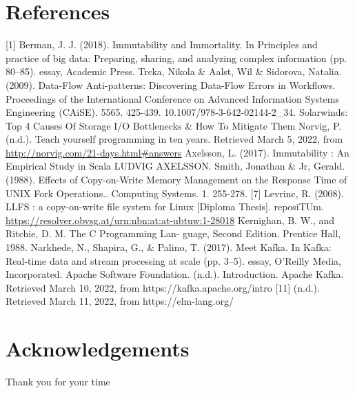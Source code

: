 \documentclass[12pt,twoside]{article}
\begin{document}
\section{References}
[1] Berman, J. J. (2018). Immutability and Immortality. In Principles and practice of big data: Preparing, sharing, and analyzing complex information (pp. 80–85). essay, Academic Press. \newline
[2] Trcka, Nikola \& Aalst, Wil \& Sidorova, Natalia. (2009). Data-Flow Anti-patterns: Discovering Data-Flow Errors in Workflows. Proceedings of the International Conference on Advanced Information Systems Engineering (CAiSE). 5565. 425-439. 10.1007/978-3-642-02144-2_34. \newline
[3] Solarwinds: Top 4 Causes Of Storage I/O Bottlenecks \& How To Mitigate Them \newline
[4] Norvig, P. (n.d.). Teach yourself programming in ten years. Retrieved March 5, 2022, from \url{http://norvig.com/21-days.html#answers} \newline
[5] Axelsson, L. (2017). Immutability : An Empirical Study in Scala LUDVIG AXELSSON. \newline 
[6] Smith, Jonathan \& Jr, Gerald. (1988). Effects of Copy-on-Write Memory Management on the Response Time of UNIX Fork Operations.. Computing Systems. 1. 255-278.
[7] Levrinc, R. (2008). LLFS : a copy-on-write file system for Linux [Diploma Thesis]. reposiTUm. \url{https://resolver.obvsg.at/urn:nbn:at:at-ubtuw:1-28018} \newline
[8] Kernighan, B. W., and Ritchie, D. M. The C Programming Lan-
guage, Second Edition. Prentice Hall, 1988. \newline
[9] Narkhede, N., Shapira, G., \& Palino, T. (2017). Meet Kafka. In Kafka: Real-time data and stream processing at scale (pp. 3–5). essay, O'Reilly Media, Incorporated. \newline
[10] Apache Software Foundation. (n.d.). Introduction. Apache Kafka. Retrieved March 10, 2022, from https://kafka.apache.org/intro 
[11]  (n.d.). Retrieved March 11, 2022, from https://elm-lang.org/ 







\newpage
\section{Acknowledgements}
Thank you for your time

\printbibliography
\end{document}
